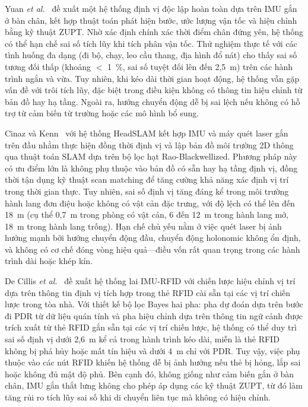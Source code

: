 Yuan \textit{et al.}~\cite{yuan2016research} đề xuất một hệ thống định vị độc lập hoàn toàn dựa trên IMU gắn ở bàn chân, kết hợp thuật toán phát hiện bước, ước lượng vận tốc và hiệu chỉnh bằng kỹ thuật ZUPT. Nhờ xác định chính xác thời điểm chân đứng yên, hệ thống có thể hạn chế sai số tích lũy khi tích phân vận tốc. Thử nghiệm thực tế với các tình huống đa dạng (đi bộ, chạy, leo cầu thang, địa hình đổ nát) cho thấy sai số tương đối thấp (khoảng $<$ 1~\%, sai số tuyệt đối lên đến 2,5~m) trên các hành trình ngắn và vừa. Tuy nhiên, khi kéo dài thời gian hoạt động, hệ thống vẫn gặp vấn đề với trôi tích lũy, đặc biệt trong điều kiện không có thông tin hiệu chỉnh từ bản đồ hay hạ tầng. Ngoài ra, hướng chuyển động dễ bị sai lệch nếu không có hỗ trợ từ cảm biến từ trường hoặc các mô hình bổ sung.

Cinaz và Kenn~\cite{cinaz2008headslam} với hệ thống HeadSLAM kết hợp IMU và máy quét laser gắn trên đầu nhằm thực hiện đồng thời định vị và lập bản đồ môi trường 2D thông qua thuật toán SLAM dựa trên bộ lọc hạt Rao-Blackwellized. Phương pháp này có ưu điểm lớn là không phụ thuộc vào bản đồ có sẵn hay hạ tầng định vị, đồng thời tận dụng kỹ thuật scan matching để tăng cường khả năng xác định vị trí trong thời gian thực. Tuy nhiên, sai số định vị tăng đáng kể trong môi trường hành lang đơn điệu hoặc không có vật cản đặc trưng, với độ lệch có thể lên đến 18~m (cụ thể 0,7~m trong phòng có vật cản, 6 đến 12~m trong hành lang mở, 18~m trong hành lang trống). Hạn chế chủ yếu nằm ở việc quét laser bị ảnh hưởng mạnh bởi hướng chuyển động đầu, chuyển động holonomic không ổn định, và không có cơ chế đóng vòng hiệu quả—điều vốn rất quan trọng trong các hành trình dài hoặc khép kín.

De Cillis \textit{et al.}~\cite{de2017hybrid} đề xuất hệ thống lai IMU-RFID với chiến lược hiệu chỉnh vị trí dựa trên thông tin định vị tích hợp trong thẻ RFID cài sẵn tại các vị trí chiến lược trong tòa nhà. Với thiết kế bộ lọc Bayes hai pha: pha dự đoán dựa trên bước đi PDR từ dữ liệu quán tính và pha hiệu chỉnh dựa trên thông tin ngữ cảnh được trích xuất từ thẻ RFID gắn sẵn tại các vị trí chiến lược, hệ thống có thể duy trì sai số định vị dưới 2,6~m kể cả trong hành trình kéo dài, miễn là thẻ RFID không bị phá hủy hoặc mất tín hiệu và dưới 4~m chỉ với PDR. Tuy vậy, việc phụ thuộc vào các nút RFID khiến hệ thống dễ bị ảnh hưởng nếu thẻ bị hỏng, lắp sai hoặc không đủ mật độ phủ. Bên cạnh đó, không giống như cảm biến gắn ở bàn chân, IMU gắn thắt lưng không cho phép áp dụng các kỹ thuật ZUPT, từ đó làm tăng rủi ro tích lũy sai số khi di chuyển liên tục mà không có hiệu chỉnh.

